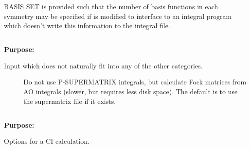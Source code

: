BASIS SET is provided such that the number of basis functions in each
symmetry may be specified if {\sir} is modified to interface to an
integral program which doesn't write this information to the integral
file.


\pagebreak[3]
\subsection{\label{ref-auxinp}}

{\bf Purpose:}

Input which does not naturally fit into any of the other
categories.

\begin{description}
\item[]
  Do not use P-SUPERMATRIX integrals, but calculate Fock matrices
  from AO integrals (slower, but requires less disk space). The
  default is to use the supermatrix file if it exists.

\end{description}

\pagebreak[3]
\subsection{\label{ref-cicinp}}

{\bf Purpose:}

Options for a CI calculation.

